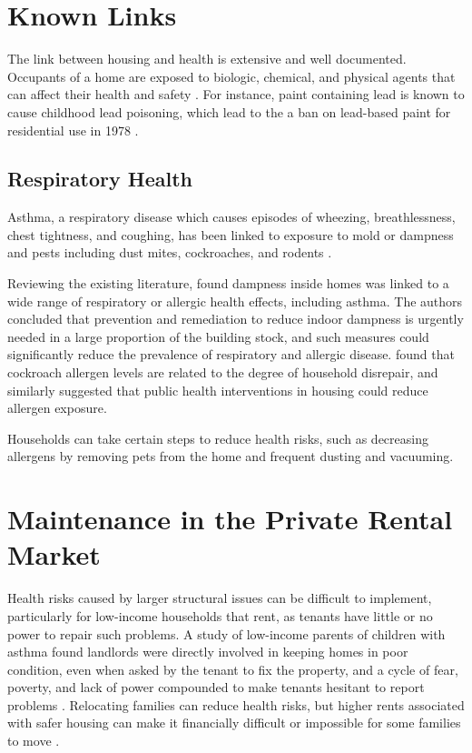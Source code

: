 \documentclass[
]{book}
\begin{document}
\hypertarget{known-links}{%
\section{Known Links}\label{known-links}}

The link between housing and health is extensive and well documented. Occupants of a home are exposed to biologic, chemical, and physical agents that can affect their health and safety \citep[ 63]{cdc2006}. For instance, paint containing lead is known to cause childhood lead poisoning, which lead to the a ban on lead-based paint for residential use in 1978 \citep{cdc2020}.

\hypertarget{respiratory-health}{%
\subsection{Respiratory Health}\label{respiratory-health}}

Asthma, a respiratory disease which causes episodes of wheezing, breathlessness, chest tightness, and coughing, has been linked to exposure to mold or dampness and pests including dust mites, cockroaches, and rodents \citep[ 63]{cdc2006}.

Reviewing the existing literature, \citet{mendell2011} found dampness inside homes was linked to a wide range of respiratory or allergic health effects, including asthma. The authors concluded that prevention and remediation to reduce indoor dampness is urgently needed in a large proportion of the building stock, and such measures could significantly reduce the prevalence of respiratory and allergic disease. \citet{rauh2002} found that cockroach allergen levels are related to the degree of household disrepair, and similarly suggested that public health interventions in housing could reduce allergen exposure.

Households can take certain steps to reduce health risks, such as decreasing allergens by removing pets from the home and frequent dusting and vacuuming.

\hypertarget{maintenance-in-the-private-rental-market}{%
\section{Maintenance in the Private Rental Market}\label{maintenance-in-the-private-rental-market}}

Health risks caused by larger structural issues can be difficult to implement, particularly for low-income households that rent, as tenants have little or no power to repair such problems. A study of low-income parents of children with asthma found landlords were directly involved in keeping homes in poor condition, even when asked by the tenant to fix the property, and a cycle of fear, poverty, and lack of power compounded to make tenants hesitant to report problems \citep{grineski2010}. Relocating families can reduce health risks, but higher rents associated with safer housing can make it financially difficult or impossible for some families to move \citep{mclaine2006}.
\end{document}
